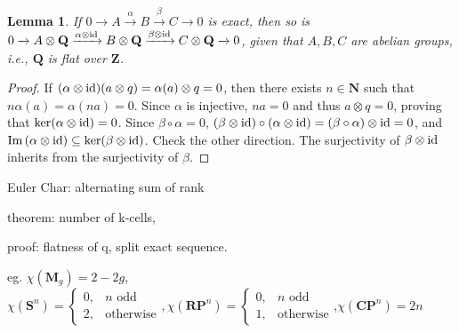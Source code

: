 \documentclass[11pt]{article}
\theoremstyle{definition}
\theoremstyle{plain}
\newtheorem*{lemma}{Lemma}
\theoremstyle{remark}
\newcommand{\id}{\textup{id}}
\newcommand{\im}{\textup{Im}\,}
\newcommand{\Z}{\mathbf{Z}}
\newcommand{\Q}{\mathbf{Q}}
\newcommand{\N}{\mathbf{N}}
\begin{document}
\begin{lemma}
If $0\xrightarrow{ }A\xrightarrow{\alpha}B\xrightarrow{\beta}C\xrightarrow{ }0$ is exact, then so is $0\xrightarrow{ }A\otimes\Q\xrightarrow{\alpha\otimes\id}B\otimes\Q\xrightarrow{\beta\otimes\id}C\otimes\Q\xrightarrow{ }0$, given that $A,B,C$ are abelian groups, i.e., $\Q$ is flat over $\Z$.
\end{lemma}
\begin{proof}
If $(\alpha\otimes\id)(a\otimes q)=\alpha(a)\otimes q=0$, then there exists $n\in\N$ such that $n\alpha(a)=\alpha(na)=0$. Since $\alpha$ is injective, $na=0$ and thus $a\otimes q=0$, proving that $\ker(\alpha\otimes\id)=0$. Since $\beta\circ\alpha=0$, $(\beta\otimes\id)\circ(\alpha\otimes\id)=(\beta\circ\alpha)\otimes\id=0$, and $\im(\alpha\otimes\id)\subseteq\ker(\beta\otimes\id)$. Check the other direction. The surjectivity of $\beta\otimes\id$ inherits from the surjectivity of $\beta$.
\end{proof}

Euler Char: alternating sum of rank

theorem: number of k-cells,

proof: flatness of q, split exact sequence.

eg. $\chi(\mathbf{M}_g)=2-2g$, $\chi(\mathbf{S}^n)=\begin{cases}0,&n\textrm{ odd}\\2,&\textrm{otherwise}
\end{cases},\chi(\mathbf{RP}^n)=\begin{cases}0,&n\textrm{ odd}\\1,&\textrm{otherwise}
\end{cases}$,$\chi(\mathbf{CP}^n)=2n$
\end{document}
